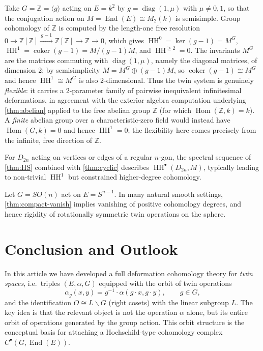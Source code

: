\documentclass[11pt,a4paper]{article}
\numberwithin{equation}{section}
\newcommand{\Z}{\mathbb{Z}}
\DeclareMathOperator{\End}{End}
\DeclareMathOperator{\Hom}{Hom}
\DeclareMathOperator{\HH}{HH}
\newcommand{\TwinSpace}{(E,\alpha,G)}
\newcommand{\TwinOrbit}{O}
\newcommand{\LinearSubgroup}{L}
\newcommand{\Cochain}{C}
\begin{document}
	\begin{example}
		Take $G=\Z=\langle g\rangle$ acting on $E=k^2$ by $g=\operatorname{diag}(1,\mu)$ with $\mu\neq 0,1$, so that the
		conjugation action on $M=\End(E)\cong M_2(k)$ is semisimple. Group cohomology of $\Z$ is computed by the
		length-one free resolution $0\to\Z[\Z]\xrightarrow{\,g-1\,}\Z[\Z]\to\Z\to 0$, which gives
		$\HH^0=\ker(g-1)=M^G$, $\HH^1=\operatorname{coker}(g-1)=M/(g-1)M$, and $\HH^{\ge 2}=0$. The invariants
		$M^G$ are the matrices commuting with $\operatorname{diag}(1,\mu)$, namely the diagonal matrices, of
		dimension $2$; by semisimplicity $M=M^G\oplus(g-1)M$, so $\operatorname{coker}(g-1)\cong M^G$ and
		hence $\HH^1\cong M^G$ is also $2$-dimensional.
		Thus the twin system is genuinely \emph{flexible}: it carries a $2$-parameter family of pairwise
		inequivalent infinitesimal deformations, in agreement with the exterior-algebra computation underlying
		\cref{thm:abelian} applied to the free abelian group $\Z$ (for which $\Hom(\Z,k)=k$). A \emph{finite}
		abelian group over a characteristic-zero field would instead have $\Hom(G,k)=0$ and hence $\HH^1=0$;
		the flexibility here comes precisely from the infinite, free direction of $\Z$.
	\end{example}
	
	\begin{example}
		For $D_{2n}$ acting on vertices or edges of a regular $n$-gon, the spectral sequence
		of \cref{thm:HS} combined with \cref{thm:cyclic} describes $\HH^\bullet(D_{2n},M)$,
		typically leading to non-trivial $\HH^1$ but constrained higher-degree cohomology.
	\end{example}
	
	\begin{example}
		Let $G=SO(n)$ act on $E=S^{n-1}$. In many natural smooth settings, 
		\cref{thm:compact-vanish} implies vanishing of positive cohomology degrees, and hence
		rigidity of rotationally symmetric twin operations on the sphere.
	\end{example}
	
	\section{Conclusion and Outlook}
	\label{sec:conclusion}
	
	In this article we have developed a full deformation cohomology theory for \emph{twin spaces},
	i.e.\ triples $\TwinSpace$ equipped with the orbit of twin operations
	\[
	\alpha_g(x,y) = g^{-1}\cdot \alpha(g\cdot x,g\cdot y), \qquad g\in G,
	\]
	and the identification $\TwinOrbit \cong \LinearSubgroup\backslash G$ (right cosets) with the linear subgroup $\LinearSubgroup$.
	The key idea is that the relevant object is not the operation $\alpha$ alone,
	but its entire orbit of operations generated by the group action.
	This orbit structure is the conceptual basis for attaching a Hochschild-type cohomology complex
	$\Cochain^\bullet(G,\End(E))$.
	
\end{document}

